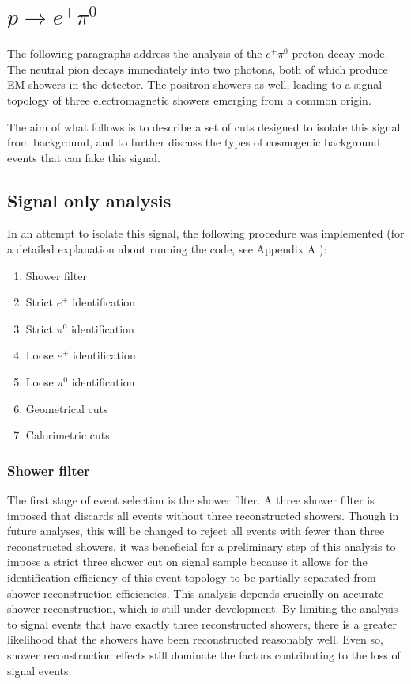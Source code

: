 \documentclass[a4paper, 10pt]{article}
\begin{document}
\clearpage
\section{$p \rightarrow e^{+} \pi^{0}$}
The following paragraphs address the analysis of the  $e^{+} \pi^{0}$ proton decay mode.\\
The neutral pion decays immediately into two photons, both of which produce EM showers in the detector. The positron showers as well, leading to a signal topology of three electromagnetic showers emerging from a common origin.

The aim of what follows is to describe a set of cuts designed to isolate this signal from background, and to further discuss the types of cosmogenic background events that can fake this signal.

\subsection{Signal only analysis}

In an attempt to isolate this signal, the following procedure was implemented (for a detailed explanation about running the code, see Appendix A ):
\begin{enumerate}[topsep=10pt,itemsep=-1ex,partopsep=10pt,parsep=1ex]
\item Shower filter
\item Strict $e^{+}$ identification
\item Strict $\pi^{0}$ identification
\item Loose $e^{+}$ identification
\item Loose $\pi^{0}$ identification
\item Geometrical cuts
\item Calorimetric cuts
\end{enumerate}


\subsubsection{Shower filter}

The first stage of event selection is the shower filter. A three shower filter is imposed that discards all events without three reconstructed showers. Though in future analyses, this will be changed to reject all events with fewer than three reconstructed showers, it was beneficial for a preliminary step of this analysis to impose a strict three shower cut on signal sample because it allows for the identification efficiency of this event topology to be partially separated from shower reconstruction efficiencies. This analysis depends crucially on accurate shower reconstruction, which is still under development. By limiting the analysis to signal events that have exactly three reconstructed showers, there is a greater likelihood that the showers have been reconstructed reasonably well. Even so, shower reconstruction effects still dominate the factors contributing to the loss of signal events.
\end{document}

